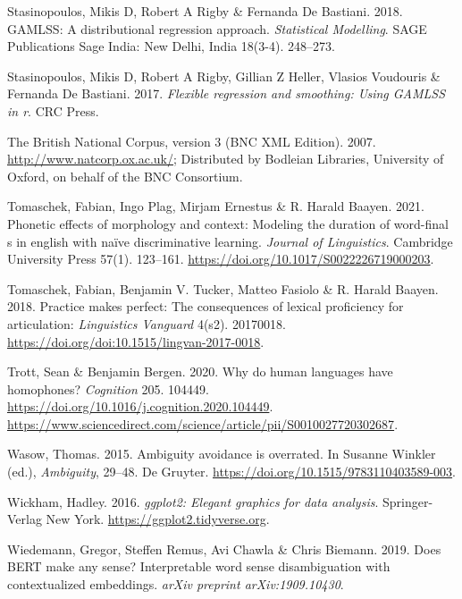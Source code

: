 \documentclass[
]{article}
\newlength{\cslhangindent}
\newlength{\cslentryspacingunit} %
\newenvironment{CSLReferences}[2] %
 {%
  \setlength{\parindent}{0pt}
  \ifodd #1
  \let\oldpar\par
  \def\par{\hangindent=\cslhangindent\oldpar}
  \fi
  \setlength{\parskip}{#2\cslentryspacingunit}
 }%
 {}
\begin{document}
\begin{CSLReferences}{1}{0}
\leavevmode{}%
Stasinopoulos, Mikis D, Robert A Rigby \& Fernanda De Bastiani. 2018.
GAMLSS: A distributional regression approach. \emph{Statistical
Modelling}. SAGE Publications Sage India: New Delhi, India 18(3-4).
248--273.

\leavevmode{}%
Stasinopoulos, Mikis D, Robert A Rigby, Gillian Z Heller, Vlasios
Voudouris \& Fernanda De Bastiani. 2017. \emph{Flexible regression and
smoothing: Using GAMLSS in r}. CRC Press.

\leavevmode{}%
The British National Corpus, version 3 (BNC XML Edition). 2007.
\url{http://www.natcorp.ox.ac.uk/}; Distributed by Bodleian Libraries,
University of Oxford, on behalf of the BNC Consortium.

\leavevmode{}%
Tomaschek, Fabian, Ingo Plag, Mirjam Ernestus \& R. Harald Baayen. 2021.
Phonetic effects of morphology and context: Modeling the duration of
word-final s in english with naïve discriminative learning.
\emph{Journal of Linguistics}. Cambridge University Press 57(1).
123--161. \url{https://doi.org/10.1017/S0022226719000203}.

\leavevmode{}%
Tomaschek, Fabian, Benjamin V. Tucker, Matteo Fasiolo \& R. Harald
Baayen. 2018. Practice makes perfect: The consequences of lexical
proficiency for articulation: \emph{Linguistics Vanguard} 4(s2).
20170018. \url{https://doi.org/doi:10.1515/lingvan-2017-0018}.

\leavevmode{}%
Trott, Sean \& Benjamin Bergen. 2020. Why do human languages have
homophones? \emph{Cognition} 205. 104449.
\url{https://doi.org/10.1016/j.cognition.2020.104449}.
\url{https://www.sciencedirect.com/science/article/pii/S0010027720302687}.

\leavevmode{}%
Wasow, Thomas. 2015. Ambiguity avoidance is overrated. In Susanne
Winkler (ed.), \emph{Ambiguity}, 29--48. De Gruyter.
\url{https://doi.org/10.1515/9783110403589-003}.

\leavevmode{}%
Wickham, Hadley. 2016. \emph{ggplot2: Elegant graphics for data
analysis}. Springer-Verlag New York.
\url{https://ggplot2.tidyverse.org}.

\leavevmode{}%
Wiedemann, Gregor, Steffen Remus, Avi Chawla \& Chris Biemann. 2019.
Does BERT make any sense? Interpretable word sense disambiguation with
contextualized embeddings. \emph{arXiv preprint arXiv:1909.10430}.


\end{CSLReferences}
\end{document}
